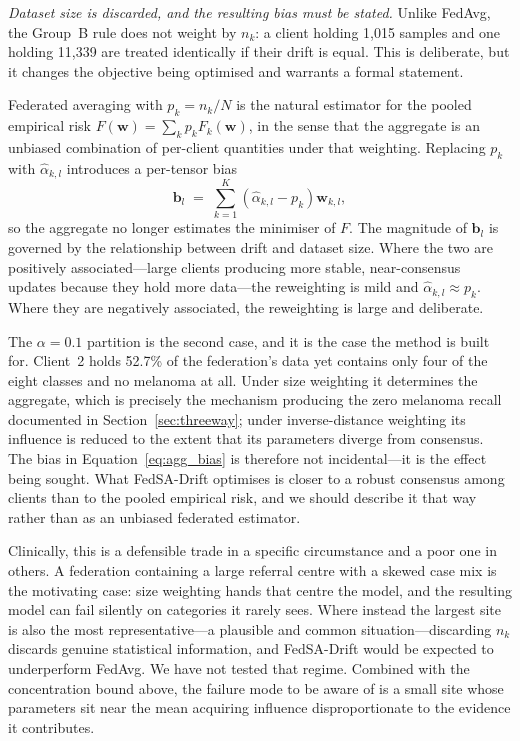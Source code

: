\documentclass[utf8]{FrontiersinHarvard} %
\newcommand{\sadrift}{FedSA-Drift}
\begin{document}
\emph{Dataset size is discarded, and the resulting bias must be stated.} Unlike FedAvg, the Group~B rule does not weight by $n_k$: a client holding 1,015 samples and one holding 11,339 are treated identically if their drift is equal. This is deliberate, but it changes the objective being optimised and warrants a formal statement.

Federated averaging with $p_k = n_k/N$ is the natural estimator for the pooled empirical risk $F(\mathbf{w}) = \sum_k p_k F_k(\mathbf{w})$, in the sense that the aggregate is an unbiased combination of per-client quantities under that weighting. Replacing $p_k$ with $\hat{\alpha}_{k,l}$ introduces a per-tensor bias
\begin{equation}
\label{eq:agg_bias}
\mathbf{b}_l \;=\; \sum_{k=1}^{K} \left(\hat{\alpha}_{k,l} - p_k\right)\mathbf{w}_{k,l},
\end{equation}
so the aggregate no longer estimates the minimiser of $F$. The magnitude of $\mathbf{b}_l$ is governed by the relationship between drift and dataset size. Where the two are positively associated---large clients producing more stable, near-consensus updates because they hold more data---the reweighting is mild and $\hat{\alpha}_{k,l} \approx p_k$. Where they are negatively associated, the reweighting is large and deliberate.

The $\alpha{=}0.1$ partition is the second case, and it is the case the method is built for. Client~2 holds 52.7\% of the federation's data yet contains only four of the eight classes and no melanoma at all. Under size weighting it determines the aggregate, which is precisely the mechanism producing the zero melanoma recall documented in Section~\ref{sec:threeway}; under inverse-distance weighting its influence is reduced to the extent that its parameters diverge from consensus. The bias in Equation~\eqref{eq:agg_bias} is therefore not incidental---it is the effect being sought. What \sadrift{} optimises is closer to a robust consensus among clients than to the pooled empirical risk, and we should describe it that way rather than as an unbiased federated estimator.

Clinically, this is a defensible trade in a specific circumstance and a poor one in others. A federation containing a large referral centre with a skewed case mix is the motivating case: size weighting hands that centre the model, and the resulting model can fail silently on categories it rarely sees. Where instead the largest site is also the most representative---a plausible and common situation---discarding $n_k$ discards genuine statistical information, and \sadrift{} would be expected to underperform FedAvg. We have not tested that regime. Combined with the concentration bound above, the failure mode to be aware of is a small site whose parameters sit near the mean acquiring influence disproportionate to the evidence it contributes.
\end{document}
